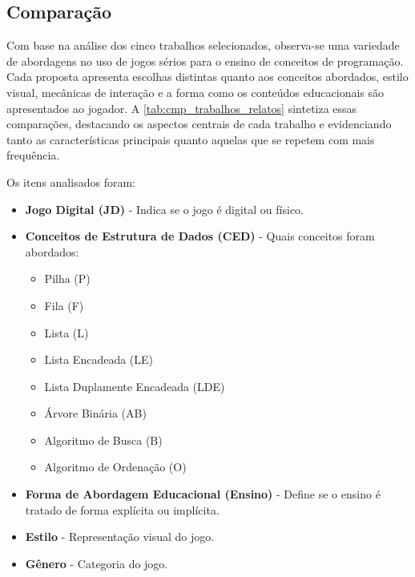 \subsection{Comparação}

Com base na análise dos cinco trabalhos selecionados, observa-se uma variedade de abordagens no uso de jogos sérios para o ensino de conceitos de programação. Cada proposta apresenta escolhas distintas quanto aos conceitos abordados, estilo visual, mecânicas de interação e a forma como os conteúdos educacionais são apresentados ao jogador. A \autoref{tab:cmp_trabalhos_relatos} sintetiza essas comparações, destacando os aspectos centrais de cada trabalho e evidenciando tanto as características principais quanto aquelas que se repetem com mais frequência.

Os itens analisados foram:

\begin{itemize}
  \item \textbf{Jogo Digital (JD)} - Indica se o jogo é digital ou físico.
  \item \textbf{Conceitos de Estrutura de Dados (CED)} - Quais conceitos foram abordados:
    \begin{itemize}
      \item Pilha (P)
      \item Fila (F)
      \item Lista (L)
      \item Lista Encadeada (LE)
      \item Lista Duplamente Encadeada (LDE)
      \item Árvore Binária (AB)
      \item Algoritmo de Busca (B)
      \item Algoritmo de Ordenação (O)
    \end{itemize}
  \item \textbf{Forma de Abordagem Educacional (Ensino)} - Define se o ensino é tratado de forma explícita ou implícita.
  \item \textbf{Estilo} - Representação visual do jogo.
  \item \textbf{Gênero} - Categoria do jogo.
\end{itemize}


